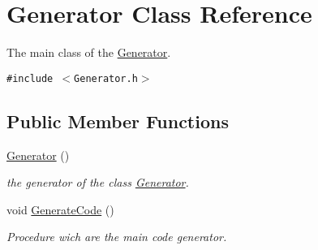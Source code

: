 \hypertarget{class_generator}{
\section{Generator Class Reference}
\label{class_generator}
}
The main class of the \hyperlink{class_generator}{Generator}.  


{\tt \#include $<$Generator.h$>$}

\subsection*{Public Member Functions}
\begin{CompactItemize}
\item 
\hyperlink{class_generator_aaf1e5f3a47ede3ef8a96a301ee04a10}{Generator} ()
\begin{CompactList}\small\item\em the generator of the class \hyperlink{class_generator}{Generator}. \item\end{CompactList}\item 
void \hyperlink{class_generator_caee4fe4990cee0447f0cb27ef413c9b}{GenerateCode} ()
\begin{CompactList}\small\item\em Procedure wich are the main code generator. \item\end{CompactList}\end{CompactItemize}
